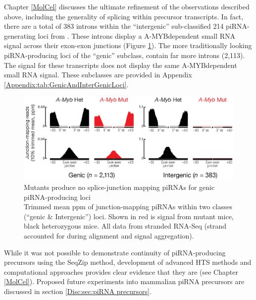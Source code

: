   Chapter \ref{MolCel} discusses the ultimate refinement of the observations described above, including the generality of splicing within precursor transcripts. In fact, there are a total of 383 introns within the ``intergenic'' sub-classified 214 piRNA-generating loci from \citep{Li2013e}. These introns display a A-MYB\textendash dependent small RNA signal across their exon-exon junctions (Figure \ref{SeqZipMethod:fig: amyb makes SJ mapping}). The more traditionally looking piRNA-producing loci of the ``genic'' subclass, contain far more introns (2,113). The signal for these transcripts does not display the same A-MYB\textendash dependent small RNA signal. These subclasses are provided in Appendix \ref{Appendix:tab:GenicAndInterGenicLoci}. 

  \begin{figure} %
    \centering 
    \includegraphics{Figures/SeqZipMethod/aggregatePiRNAsatSpliceJunctions.eps}
    \caption[\amyb{} Mutants produce no splice-junction mapping piRNAs for genic piRNA-producing loci]
    {
      \amyb{} Mutants produce no splice-junction mapping piRNAs for genic piRNA-producing loci\\[0.25cm]
      Trimmed mean ppm of junction-mapping piRNAs within two classes (``genic \& Intergenic'') loci. Shown in red is signal from \amyb{} mutant mice, black \amyb{} heterozygous mice. All data from stranded RNA-Seq (strand accounted for during alignment and signal aggregation).
      }
    \label{SeqZipMethod:fig: amyb makes SJ mapping}
    \end{figure}

  While it was not possible to demonstrate continuity of piRNA-producing precursors using the SeqZip method, development of advanced HTS methods and computational approaches provides clear evidence that they are (see Chapter \ref{MolCel}). Proposed future experiments into mammalian piRNA precursors are discussed in section \ref{Disc:sec:piRNA precursors}.

\cleardoublepage